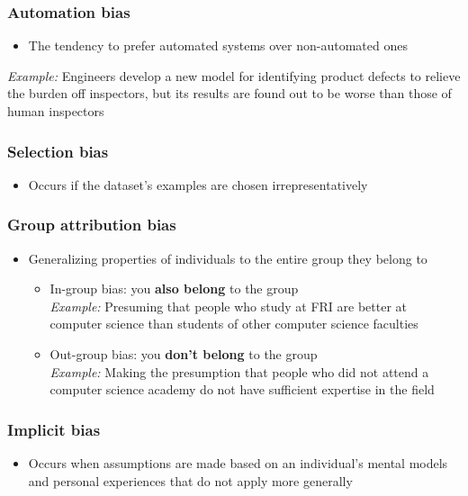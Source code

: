 \documentclass{article}
\begin{document}
        \subsubsection{Automation bias}
        \begin{itemize}
            \item The tendency to prefer automated systems over non-automated ones
        \end{itemize}
        \textit{Example:} Engineers develop a new model for identifying product defects to relieve the burden off inspectors, but its results are found out to be worse than those of human inspectors

        \subsubsection{Selection bias}
        \begin{itemize}
            \item Occurs if the dataset's examples are chosen irrepresentatively
        \end{itemize}

        \subsubsection{Group attribution bias}
        \begin{itemize}
            \item Generalizing properties of individuals to the entire group they belong to
            \begin{itemize}
                \item In-group bias: you \textbf{also belong} to the group \\
                \textit{Example:} Presuming that people who study at FRI are better at computer science than students of other computer science faculties 
                \item Out-group bias: you \textbf{don't belong} to the group \\
                \textit{Example:} Making the presumption that people who did not attend a computer science academy do not have sufficient expertise in the field
            \end{itemize} 
        \end{itemize}

        \subsubsection{Implicit bias}
        \begin{itemize}
            \item Occurs when assumptions are made based on an individual's mental models and personal experiences that do not apply more generally
        \end{itemize}
\end{document}
